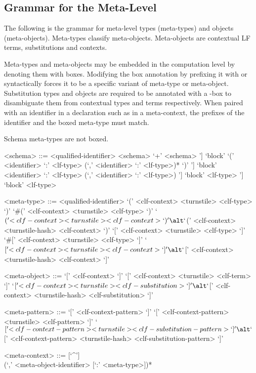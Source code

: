 \subsection{Grammar for the Meta-Level}\label{section:syntax-meta-level}

The following is the grammar for meta-level types (meta-types) and objects (meta-objects).
Meta-types classify meta-objects.
Meta-objects are contextual \ac{LF} terms, substitutions and contexts.

Meta-types and meta-objects may be embedded in the computation level by denoting them with boxes.
Modifying the box annotation by prefixing it with \syntax{\#} or \syntax{\$} syntactically forces it to be a specific variant of meta-type or meta-object.
Substitution types and objects are required to be annotated with a \syntax{\$}-box to disambiguate them from contextual types and terms respectively.
When paired with an identifier in a declaration such as in a meta-context, the prefixes of the identifier and the boxed meta-type must match.

Schema meta-types are not boxed.

\begin{grammar}
<schema> ::= <qualified-identifier>
\alt <schema> `+' <schema>
\alt [`some' `[' <identifier> `:' <lf-type> (`,' <identifier> `:' <lf-type>)* `]'] `block' `(' <identifier> `:' <lf-type> (`,' <identifier> `:' <lf-type>)* `)'
\alt [`some' `[' <identifier> `:' <lf-type> (`,' <identifier> `:' <lf-type>)* `]'] `block' <identifier> `:' <lf-type> (`,' <identifier> `:' <lf-type>)
\alt [`some' `[' <identifier> `:' <lf-type> (`,' <identifier> `:' <lf-type>)* `]'] `block' <lf-type>
\alt [`some' `[' <identifier> `:' <lf-type> (`,' <identifier> `:' <lf-type>)* `]'] `block' <lf-type>

<meta-type> ::= <qualified-identifier>
\alt `(' <clf-context> <turnstile> <clf-type> `)'
\alt `#(' <clf-context> <turnstile> <clf-type> `)'
\alt `$(' <clf-context> <turnstile> <clf-context> `)'
\alt `$(' <clf-context> <turnstile-hash> <clf-context> `)'
\alt `[' <clf-context> <turnstile> <clf-type> `]'
\alt `#[' <clf-context> <turnstile> <clf-type> `]'
\alt `$[' <clf-context> <turnstile> <clf-context> `]'
\alt `$[' <clf-context> <turnstile-hash> <clf-context> `]'

<meta-object> ::= `[' <clf-context> `]'
\alt `[' <clf-context> <turnstile> <clf-term> `]'
\alt `$[' <clf-context> <turnstile> <clf-substitution> `]'
\alt `$[' <clf-context> <turnstile-hash> <clf-substitution> `]'

<meta-pattern> ::= `[' <clf-context-pattern> `]'
\alt `[' <clf-context-pattern> <turnstile> <clf-pattern> `]'
\alt `$[' <clf-context-pattern> <turnstile> <clf-substitution-pattern> `]'
\alt `$[' <clf-context-pattern> <turnstile-hash> <clf-substitution-pattern> `]'

<meta-context> ::= [`^']
\\
(`,' <meta-object-identifier> [`:' <meta-type>])*
\end{grammar}

